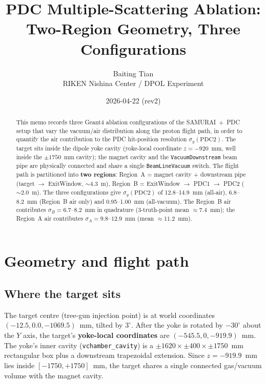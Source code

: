 \documentclass[a4paper, 11pt]{article}
\title{\textbf{PDC Multiple-Scattering Ablation:\\ Two-Region Geometry, Three Configurations}}
\author{Baiting Tian \\ RIKEN Nishina Center / DPOL Experiment}
\date{2026-04-22 (rev2)}
\begin{document}
\maketitle

\begin{abstract}
\noindent
This memo records three Geant4 ablation configurations of the SAMURAI~+~PDC setup that vary the vacuum/air distribution along the proton flight path, in order to quantify the air contribution to the PDC hit-position resolution $\sigma_y(\mathrm{PDC2})$. The target sits inside the dipole yoke cavity (yoke-local coordinate $z = -920$~mm, well inside the $\pm 1750$~mm cavity); the magnet cavity and the \texttt{VacuumDownstream} beam pipe are physically connected and share a single \texttt{BeamLineVacuum} switch. The flight path is partitioned into \textbf{two regions}: Region~A = magnet cavity + downstream pipe (target $\to$ ExitWindow, $\sim 4.3$~m), Region~B = ExitWindow $\to$ PDC1 $\to$ PDC2 ($\sim 2.0$~m). The three configurations give $\sigma_y(\mathrm{PDC2})$ of 12.8--14.9~mm (all-air), 6.8--8.2~mm (Region~B air only) and 0.95--1.00~mm (all-vacuum). The Region~B air contributes $\sigma_B = 6.7$--$8.2$~mm in quadrature (3-truth-point mean $\approx 7.4$~mm); the Region~A air contributes $\sigma_A = 9.8$--$12.9$~mm (mean $\approx 11.2$~mm).
\end{abstract}

\tableofcontents

\section{Geometry and flight path}

\subsection{Where the target sits}

The target centre (tree-gun injection point) is at world coordinates $(-12.5, 0.0, -1069.5)$~mm, tilted by $3^\circ$. After the yoke is rotated by $-30^\circ$ about the $Y$ axis, the target's \textbf{yoke-local coordinates} are $(-545.5, 0, -919.9)$~mm. The yoke's inner cavity (\texttt{vchamber\_cavity}) is a $\pm 1620 \times \pm 400 \times \pm 1750$~mm rectangular box plus a downstream trapezoidal extension. Since $z = -919.9$~mm lies inside $[-1750, +1750]$~mm, the target shares a single connected gas/vacuum volume with the magnet cavity.
\end{document}
